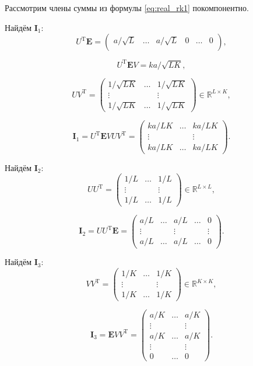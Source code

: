 \documentclass[specialist,
               substylefile = spbu.rtx,
               subf,href,colorlinks=true, 12pt]{disser}
\begin{document}
Рассмотрим члены суммы из формулы \eqref{eq:real_rk1} покомпонентно.

Найдём $\mathbf{I}_1$:
$$U^{\mathrm{T}} \mathbf{E} = \begin{pmatrix}
	 a/\sqrt{L} & \ldots & a/\sqrt{L} & 0 & \ldots & 0\\
\end{pmatrix},$$

$$U^{\mathrm{T}} \mathbf{E} V = k a / \sqrt{LK},$$

$$U V^{\mathrm{T}} = \begin{pmatrix}
	1/\sqrt{LK} & \ldots & 1/\sqrt{LK}\\
	\vdots & & \vdots\\
	1/\sqrt{LK} &   \ldots &  1/\sqrt{LK}
\end{pmatrix}\in \mathbb{R}^{L \times K}
,$$

$$\mathbf{I}_1 = U^{\mathrm{T}} \mathbf{E} V U V^{\mathrm{T}} = \begin{pmatrix}
	k a/ LK & \ldots &  k a/ LK\\
	\vdots & & \vdots\\
	k a/ LK &   \ldots &  k a/ LK
\end{pmatrix}.$$

Найдём $\mathbf{I}_2$:
$$U U^{\mathrm{T}} = \begin{pmatrix}
	1/L & \ldots & 1/L\\
	
	\vdots & & \vdots\\
	1/L &   \ldots &  1/L
\end{pmatrix}\in \mathbb{R}^{L \times L},$$

$$\mathbf{I}_2 = U U^{\mathrm{T}} \mathbf{E} = \begin{pmatrix}
	a/L & \ldots & a/L & \ldots & 0\\
	\vdots & & \vdots & & \vdots\\
	a/L & \ldots & a/L & \ldots & 0
\end{pmatrix}.$$

Найдём $\mathbf{I}_3$:
$$V V^{\mathrm{T}} = \begin{pmatrix}
	1/K & \ldots & 1/K\\
	\vdots & & \vdots\\
	1/K &   \ldots &  1/K
\end{pmatrix}\in \mathbb{R}^{K \times K},$$

$$\mathbf{I}_3 = \mathbf{E} V V^{\mathrm{T}} = \begin{pmatrix}
	a/K &  \ldots & a/K\\
	\vdots & & \vdots\\
	a/K &  \ldots & a/K\\
	\vdots & & \vdots\\
	0 & \ldots & 0
\end{pmatrix}.$$
\end{document}
